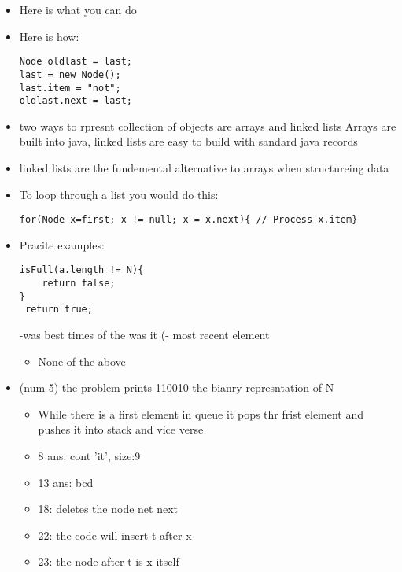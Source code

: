 \documentclass[11pt]{report}
\begin{document}
\begin{itemize}
\item Here is what you can do

\item Here is how:
\begin{verbatim}
Node oldlast = last;
last = new Node();
last.item = "not";
oldlast.next = last;

\end{verbatim}
\end{itemize}
\begin{itemize}
\item two ways to rpresnt collection of objects are arrays and linked lists
Arrays are built into java, linked lists are easy to build with sandard java
records
\item linked lists are the fundemental alternative to arrays when structureing data

\item To loop through a list you would do this:
\begin{verbatim}
for(Node x=first; x != null; x = x.next){ // Process x.item}

\end{verbatim}

\item Pracite examples:

\begin{verbatim}
isFull(a.length != N){
    return false;
}
 return true;
\end{verbatim}
-was best times of the was it  (- most recent element

\begin{itemize}
\item None of the above
\end{itemize}

\item (num 5) the problem prints 110010 the bianry represntation of N

\begin{itemize}
\item While there is a first element in queue it pops thr frist element
and pushes it into stack and vice verse

\item 8 ans: cont 'it', size:9

\item 13 ans: bcd

\item 18: deletes the node net next

\item 22: the code will insert t after x

\item 23: the node after t is x itself
\end{itemize}
\end{itemize}
\end{document}
